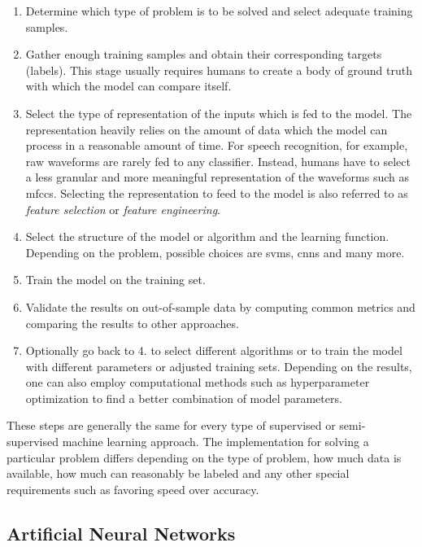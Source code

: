 \documentclass[draft,final]{vutinfth} %
\begin{document}
\begin{enumerate}
\item Determine which type of problem is to be solved and select
  adequate training samples.
\item Gather enough training samples and obtain their corresponding
  targets (labels). This stage usually requires humans to create a
  body of ground truth with which the model can compare itself.
\item Select the type of representation of the inputs which is fed to
  the model. The representation heavily relies on the amount of data
  which the model can process in a reasonable amount of time. For
  speech recognition, for example, raw waveforms are rarely fed to any
  classifier. Instead, humans have to select a less granular and more
  meaningful representation of the waveforms such as
  \glspl{mfcc}. Selecting the representation to feed to the model is
  also referred to as \emph{feature selection} or \emph{feature
  engineering}.
\item Select the structure of the model or algorithm and the learning
  function. Depending on the problem, possible choices are
  \glspl{svm}, \glspl{cnn} and many more.
\item Train the model on the training set.
\item Validate the results on out-of-sample data by computing common
  metrics and comparing the results to other approaches.
\item Optionally go back to 4. to select different algorithms or to
  train the model with different parameters or adjusted training
  sets. Depending on the results, one can also employ computational
  methods such as hyperparameter optimization to find a better
  combination of model parameters.
\end{enumerate}

These steps are generally the same for every type of supervised or
semi-supervised machine learning approach. The implementation for
solving a particular problem differs depending on the type of problem,
how much data is available, how much can reasonably be labeled and any
other special requirements such as favoring speed over accuracy.

\subsection{Artificial Neural Networks}
\label{ssec:theory-nn}
\end{document}
